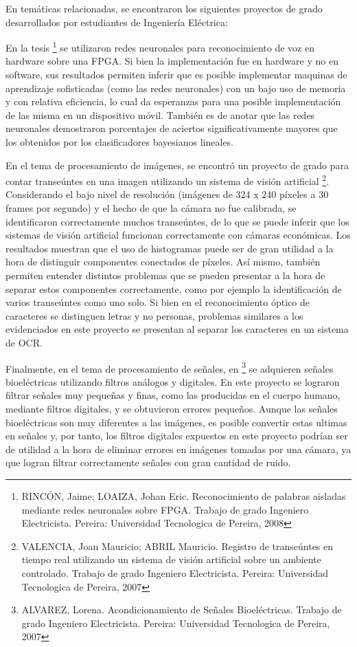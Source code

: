 \documentclass[a4paper, 11pt, oneside]{article}
\begin{document}
    
	En temáticas relacionadas, se encontraron los siguientes proyectos de grado desarrollados por 
    estudiantes de Ingeniería Eléctrica:
    
    En la tesis \footnote{RINCÓN, Jaime; LOAIZA, Johan Eric. Reconocimiento de palabras aisladas mediante
    redes neuronales sobre FPGA. Trabajo de grado Ingeniero Electricista. Pereira: Universidad Tecnologica 
    de Pereira, 2008} se utilizaron redes neuronales para reconocimiento de voz en hardware sobre una FPGA. 
    Si bien la implementación fue en hardware y no en software, sus resultados permiten inferir que es 
    posible implementar maquinas de aprendizaje sofisticadas (como las redes neuronales) con un bajo uso
    de memoria y con relativa eficiencia, lo cual da esperanzas para una posible implementación de las 
    misma en un dispositivo móvil. También es de anotar que las redes neuronales demostraron porcentajes 
    de aciertos significativamente mayores que los obtenidos por los clasificadores bayesianos lineales.

	En el tema de procesamiento de imágenes, se encontró un proyecto de grado para contar transeúntes en
    una imagen utilizando un sistema de visión artificial \footnote{VALENCIA, Joan Mauricio; ABRIL Mauricio.
    Registro de transeúntes en tiempo real utilizando un sistema de visión artificial sobre un ambiente 
    controlado. Trabajo de grado Ingeniero Electricista. Pereira: Universidad Tecnologica de Pereira, 2007}.
    Considerando el bajo nivel de resolución (imágenes de 324 x 240 píxeles a 30 frames por segundo) y el 
    hecho de que la cámara no fue calibrada, se identificaron correctamente muchos transeúntes, de lo que se
    puede inferir que los sistemas de visión artificial funcionan correctamente con cámaras económicas. Los 
    resultados muestran que el uso de histogramas puede ser de gran utilidad a la hora de distinguir componentes
    conectados de píxeles. Así mismo, también permiten entender distintos problemas que se pueden presentar a 
    la hora de separar estos componentes correctamente, como por ejemplo la identificación de varios transeúntes 
    como uno solo. Si bien en el reconocimiento óptico de caracteres se distinguen letras y no personas, problemas
    similares a los evidenciados en este proyecto se presentan al separar los caracteres en un sistema de OCR.
	
	Finalmente, en el tema de procesamiento de señales, en \footnote{ALVAREZ, Lorena. Acondicionamiento de Señales
    Bioeléctricas. Trabajo de grado Ingeniero Electricista. Pereira: Universidad Tecnologica de Pereira, 2007} 
    se adquieren señales bioeléctricas utilizando filtros análogos y digitales. En este proyecto se lograron filtrar
    señales muy pequeñas y finas, como las producidas en el cuerpo humano, mediante filtros digitales, y se obtuvieron
    errores pequeños. Aunque las señales bioeléctricas son muy diferentes a las imágenes, es posible convertir estas
    ultimas en señales y, por tanto, los filtros digitales expuestos en este proyecto podrían ser de utilidad a la hora
    de eliminar errores en imágenes tomadas por una cámara, ya que logran filtrar correctamente señales con gran cantidad
    de ruido.\newline
	
\end{document}
